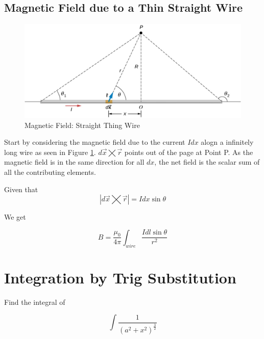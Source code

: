 \documentclass[14pt]{memoir}
\begin{document}
\section{Magnetic Field due to a Thin Straight Wire}

\begin{figure}[H]
\begin{center}
\includegraphics[scale=0.50]{fig/fig_12_05.jpg}
\caption{Magnetic Field: Straight Thing Wire}
\label{fig:12_05}
\end{center}
\end{figure}

Start by considering the magnetic field due to the current $I dx$ alogn a infinitely long wire as seen in Figure \ref{fig:12_05}.  $d\vec{x} \bigtimes \vec{r}$ points out of the page at Point P. As the magnetic field is in the same direction for all $dx$, the net field is the scalar sum of all the contributing elements. 

Given that 
\begin{equation}
|d\vec{x} \bigtimes \vec{r}| = I dx \sin{\theta}
\end{equation}

We get

\begin{equation}
B = \frac{\mu_0}{4\pi} \int_{wire} \frac{I dl \sin{\theta}}{r^2}
\end{equation}

\appendix

\chapter{Integration by Trig Substitution}
\label{sec:trigsub}

Find the integral of 

\begin{equation}
\int \frac{1}{(a^2 + x^2)^{\frac{3}{2}}}
\end{equation}
\end{document}
